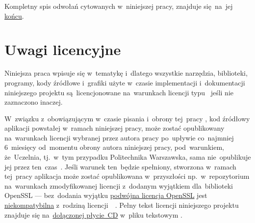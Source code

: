 \documentclass[thesis]{subfiles}
\begin{document}
Kompletny spis odwołań cytowanych w~niniejszej pracy, znajduje się~na~jej \hyperref[bibliography-page]{końcu}. %


\section{Uwagi licencyjne}

Niniejsza praca wpisuje się w~tematykę  i~dlatego wszystkie narzędzia, biblioteki, programy, kody źródłowe i~grafiki użyte w~czasie implementacji i~dokumentacji niniejszego projektu są~licencjonowane na~warunkach licencji typu~ jeśli nie zaznaczono inaczej.

W~związku z~obowiązującym w~czasie pisania i~obrony tej~pracy , kod źródłowy aplikacji powstałej w~ramach niniejszej pracy, może zostać opublikowany na~warunkach licencji wybranej przez autora pracy po~upływie co~najmniej 6~miesięcy od~momentu obrony autora niniejszej pracy, pod~warunkiem, że~Uczelnia, tj.~w~tym przypadku Politechnika Warszawska, sama nie~opublikuje jej przez ten~czas~\cite{papp}. Jeśli warunek ten~będzie spełniony, stworzona w~ramach tej~pracy aplikacja może zostać opublikowana w~przyszłości np.~w~repozytorium  na~warunkach zmodyfikowanej licencji  z~dodanym wyjątkiem dla~biblioteki OpenSSL --- bez~dodania wyjątku \href{https://www.openssl.org/source/license.html}{podwójna licencja OpenSSL} jest \href{https://www.openssl.org/docs/faq.html\#LEGAL2}{niekompatybilna} z~rodziną licencji~~\cite{openssl-license-incompatibility,openssl-license-incompatibility-2}. Pełny tekst licencji niniejszego projektu znajduje się na~\hyperref[ch:cd-appendix]{dołączonej płycie~CD} w~pliku tekstowym .

\end{document}
